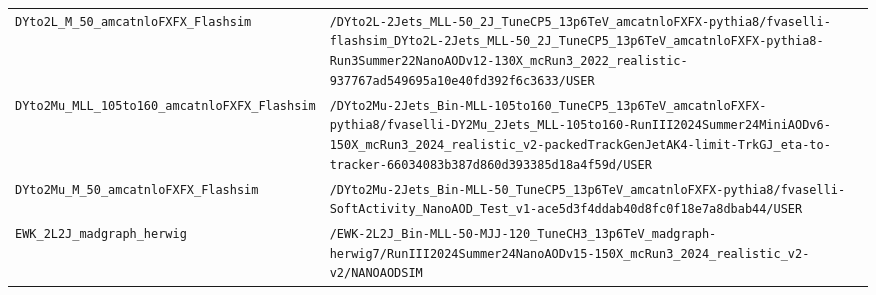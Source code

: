 \begin{longtable}{@{}>{\RaggedRight\arraybackslash}p{} >{\RaggedRight\arraybackslash}p{}@{}}
\addlinespace[2pt]
\texttt{DYto2L\_\allowbreak{}M\_\allowbreak{}50\_\allowbreak{}amcatnloFXFX\_\allowbreak{}Flashsim} & \texttt{/\allowbreak{}DYto2L-\allowbreak{}2Jets\_\allowbreak{}MLL-\allowbreak{}50\_\allowbreak{}2J\_\allowbreak{}TuneCP5\_\allowbreak{}13p6TeV\_\allowbreak{}amcatnloFXFX-\allowbreak{}pythia8/\allowbreak{}fvaselli-\allowbreak{}flashsim\_\allowbreak{}DYto2L-\allowbreak{}2Jets\_\allowbreak{}MLL-\allowbreak{}50\_\allowbreak{}2J\_\allowbreak{}TuneCP5\_\allowbreak{}13p6TeV\_\allowbreak{}amcatnloFXFX-\allowbreak{}pythia8-\allowbreak{}Run3Summer22NanoAODv12-\allowbreak{}130X\_\allowbreak{}mcRun3\_\allowbreak{}2022\_\allowbreak{}realistic-\allowbreak{}937767ad549695a10e40fd392f6c3633/\allowbreak{}USER} \\
\addlinespace[2pt]
\texttt{DYto2Mu\_\allowbreak{}MLL\_\allowbreak{}105to160\_\allowbreak{}amcatnloFXFX\_\allowbreak{}Flashsim} & \texttt{/\allowbreak{}DYto2Mu-\allowbreak{}2Jets\_\allowbreak{}Bin-\allowbreak{}MLL-\allowbreak{}105to160\_\allowbreak{}TuneCP5\_\allowbreak{}13p6TeV\_\allowbreak{}amcatnloFXFX-\allowbreak{}pythia8/\allowbreak{}fvaselli-\allowbreak{}DY2Mu\_\allowbreak{}2Jets\_\allowbreak{}MLL-\allowbreak{}105to160-\allowbreak{}RunIII2024Summer24MiniAODv6-\allowbreak{}150X\_\allowbreak{}mcRun3\_\allowbreak{}2024\_\allowbreak{}realistic\_\allowbreak{}v2-\allowbreak{}packedTrackGenJetAK4-\allowbreak{}limit-\allowbreak{}TrkGJ\_\allowbreak{}eta-\allowbreak{}to-\allowbreak{}tracker-\allowbreak{}66034083b387d860d393385d18a4f59d/\allowbreak{}USER} \\
\addlinespace[2pt]
\texttt{DYto2Mu\_\allowbreak{}M\_\allowbreak{}50\_\allowbreak{}amcatnloFXFX\_\allowbreak{}Flashsim} & \texttt{/\allowbreak{}DYto2Mu-\allowbreak{}2Jets\_\allowbreak{}Bin-\allowbreak{}MLL-\allowbreak{}50\_\allowbreak{}TuneCP5\_\allowbreak{}13p6TeV\_\allowbreak{}amcatnloFXFX-\allowbreak{}pythia8/\allowbreak{}fvaselli-\allowbreak{}SoftActivity\_\allowbreak{}NanoAOD\_\allowbreak{}Test\_\allowbreak{}v1-\allowbreak{}ace5d3f4ddab40d8fc0f18e7a8dbab44/\allowbreak{}USER} \\
\addlinespace[2pt]
\texttt{EWK\_\allowbreak{}2L2J\_\allowbreak{}madgraph\_\allowbreak{}herwig} & \texttt{/\allowbreak{}EWK-\allowbreak{}2L2J\_\allowbreak{}Bin-\allowbreak{}MLL-\allowbreak{}50-\allowbreak{}MJJ-\allowbreak{}120\_\allowbreak{}TuneCH3\_\allowbreak{}13p6TeV\_\allowbreak{}madgraph-\allowbreak{}herwig7/\allowbreak{}RunIII2024Summer24NanoAODv15-\allowbreak{}150X\_\allowbreak{}mcRun3\_\allowbreak{}2024\_\allowbreak{}realistic\_\allowbreak{}v2-\allowbreak{}v2/\allowbreak{}NANOAODSIM} \\

\end{longtable}
